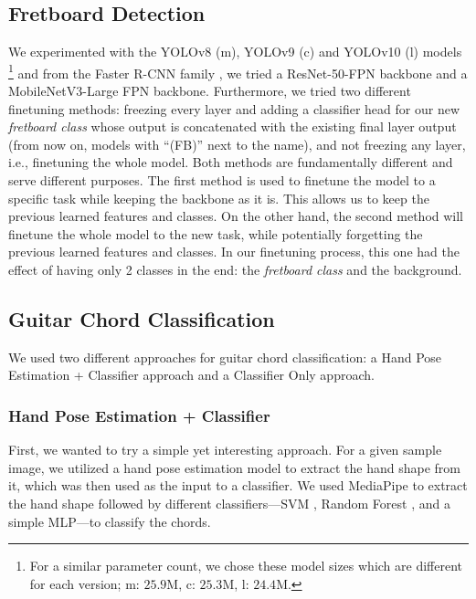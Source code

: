 \documentclass[10pt,twocolumn,letterpaper]{article}
\begin{document}
\subsection{Fretboard Detection}
We experimented with the YOLOv8 (m), YOLOv9 (c) and YOLOv10 (l) models \footnote{For a similar parameter count, we chose these model sizes which are different for each version; m: $25.9$M, c: $25.3$M, l: $24.4$M.} \cite{redmon2016you} and from the Faster R-CNN family \cite{ren2016faster}, we tried a ResNet-50-FPN backbone and a MobileNetV3-Large FPN backbone. Furthermore, we tried two different finetuning methods: freezing every layer and adding a classifier head for our new \emph{fretboard class} whose output is concatenated with the existing final layer output (from now on, models with ``(FB)'' next to the name), and not freezing any layer, i.e., finetuning the whole model. Both methods are fundamentally different and serve different purposes. The first method is used to finetune the model to a specific task while keeping the backbone as it is. This allows us to keep the previous learned features and classes. On the other hand, the second method will finetune the
whole model to the new task, while potentially forgetting the previous learned features and classes. In our finetuning process, this one had the effect of having only 2 classes in the end: the \emph{fretboard class} and the background.

\subsection{Guitar Chord Classification}
We used two different approaches for guitar chord classification: a Hand Pose Estimation + Classifier approach and a Classifier Only approach.

\subsubsection{Hand Pose Estimation + Classifier}
First, we wanted to try a simple yet interesting approach. For a given sample image, we utilized a hand pose estimation model to extract the hand shape from it, which was then used as the input to a classifier. We used MediaPipe to extract the hand shape followed by different classifiers—SVM \cite{cortes1995support}, Random Forest \cite{ho1995random}, and a simple MLP—to classify the chords.

\end{document}

